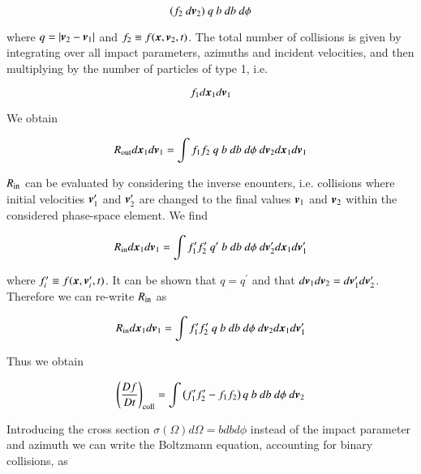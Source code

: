 \begin{equation}
(f_2 \ d\v{v}_2) \ q \ b \ db \ d\phi
\end{equation}

\noindent  where $q = |{\boldsymbol{v}}_2-{\boldsymbol{v}}_1|$ and $f_2 \equiv f({\boldsymbol{x}},{\boldsymbol{v}}_2,t)$. The total number of collisions is given by integrating over all impact parameters, azimuths and incident velocities, and then multiplying by the number of particles of type 1, i.e. 

\begin{equation}
f_1 d{\boldsymbol{x}}_1 d{\boldsymbol{v}}_1 
\end{equation}

We obtain

\begin{equation}
R_{\rm out}  d{\boldsymbol{x}}_1 d{\boldsymbol{v}}_1 = \int f_1 f_2 \ q \ b \ db \ d\phi \ d{\boldsymbol{v}}_2 d{\boldsymbol{x}}_1 d{\boldsymbol{v}}_1 
\end{equation}

\noindent $R_{\rm in}$ can be evaluated by considering the inverse enounters, i.e. collisions where initial velocities ${\boldsymbol{v}}_1^\prime$ and ${\boldsymbol{v}}_2^\prime$ are changed to the final values ${\boldsymbol{v}}_1$ and ${\boldsymbol{v}}_2$ within the considered phase-space element. We find

\begin{equation}
R_{\rm in} d{\boldsymbol{x}}_1 d{\boldsymbol{v}}_1  = \int f_1^\prime f_2^\prime \ q^\prime \ b \ db \ d\phi \ d{\boldsymbol{v}}_2^\prime d{\boldsymbol{x}}_1 d{\boldsymbol{v}}_1^\prime 
\end{equation}

\noindent  where $f_i^\prime \equiv f({\boldsymbol{x}},{\boldsymbol{v}}_i^\prime,t)$. It can
be shown that $q = q^\prime$ and that $d{\boldsymbol{v}}_1 d{\boldsymbol{v}}_2 = d{\boldsymbol{v}}_1^\prime
d{\boldsymbol{v}}_2^\prime$. Therefore we can re-write $R_{\rm in}$ as

\begin{equation}
R_{\rm in} d{\boldsymbol{x}}_1 d{\boldsymbol{v}}_1  = \int f_1^\prime f_2^\prime \ q \ b \ db \ d\phi \ d{\boldsymbol{v}}_2 d{\boldsymbol{x}}_1 d{\boldsymbol{v}}_1^\prime 
\end{equation}

\noindent  Thus we obtain

\begin{equation}
\left(\frac{Df}{Dt}\right)_{\rm coll} = \int \left(f_1^\prime f_2^\prime-f_1f_2 \right)q \ b \ db \ d\phi \ d\v{v}_2
\end{equation}

\noindent  Introducing the cross section $\sigma(\Omega)d\Omega = bdbd\phi$ instead of the impact parameter and azimuth we can write the Boltzmann equation, accounting for binary collisions, as

